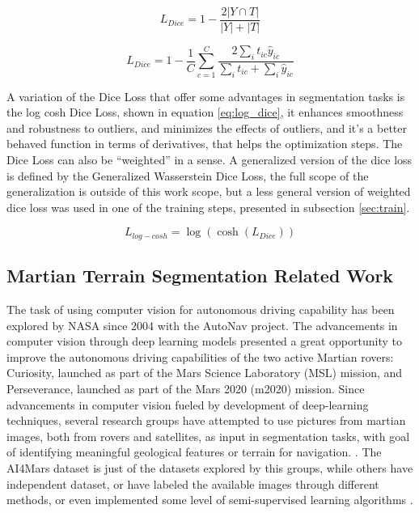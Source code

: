 \documentclass[10pt, conference]{IEEEtran}
\begin{document}
\begin{equation}
  L_{Dice} = 1 - \frac{2 |Y \cap T|}{|Y| + |T|}
  \label{eq:dice}
\end{equation}


\begin{equation}
  L_{Dice} = 1 - \frac{1}{C} \sum_{c=1}^{C} \frac{2 \sum_{i} t_{ic} \hat{y}_{ic}}{\sum_{i} t_{ic} + \sum_{i} \hat{y}_{ic}}
  \label{eq:multiclass_dice}
\end{equation}

A variation of the Dice Loss that offer some advantages in segmentation tasks is the
log cosh Dice Loss, shown in equation \ref{eq:log_dice}, it enhances smoothness and robustness to outliers,
and minimizes the effects of outliers, and it's a better behaved function in terms of derivatives, that helps
the optimization steps. The Dice Loss can also be ``weighted'' in a sense. A generalized version
of the dice loss is defined by the Generalized Wasserstein Dice Loss, the full scope of the
generalization is outside of this work scope, but a less general version of weighted dice loss
was used in one of the training steps, presented in subsection \ref{sec:train}.

\begin{equation}
  L_{log-cosh} = \log(\cosh(L_{Dice})) 
  \label{eq:log_dice}
\end{equation}

\subsection{Martian Terrain Segmentation Related Work}

The task of using computer vision for autonomous driving capability has 
been explored by NASA since 2004 \cite{Swan2021} with the AutoNav project. 
The advancements in computer vision through deep learning models 
presented a great opportunity to improve the autonomous driving 
capabilities of the two active Martian rovers: Curiosity, launched as 
part of the Mars Science Laboratory (MSL) mission, and Perseverance, 
launched as part of the Mars 2020 (m2020) mission. Since advancements
in computer vision fueled by development of deep-learning techniques,
several research groups have attempted to use pictures from martian images,
both from rovers and satellites, as input in segmentation tasks, with goal of
identifying meaningful geological features or terrain for navigation.
\cite{Swan2021, Atha2022, Goutham2022, Luna2025}.
The AI4Mars dataset is just of the datasets explored by this groups, while
others have independent dataset, or have labeled the available images through
different methods, or even implemented some level of semi-supervised learning
algorithms \cite{Goutham2022}.
\end{document}
